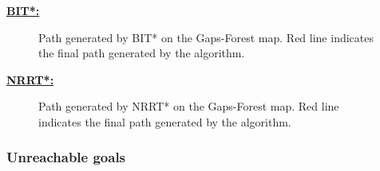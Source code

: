\documentclass{article}
\begin{document}
\textbf{\underline{BIT*:}}

\begin{figure}[H]
	\caption{Path generated by BIT* on the Gaps-Forest map. Red line indicates the final path generated by the algorithm.}
	\label{fmt:nsamples}
\end{figure}

\textbf{\underline{NRRT*:}}

\begin{figure}[H]
	\caption{Path generated by NRRT* on the Gaps-Forest map. Red line indicates the final path generated by the algorithm.}
	\label{fmt:nsamples}
\end{figure}

\subsubsection{Unreachable goals}
\end{document}
